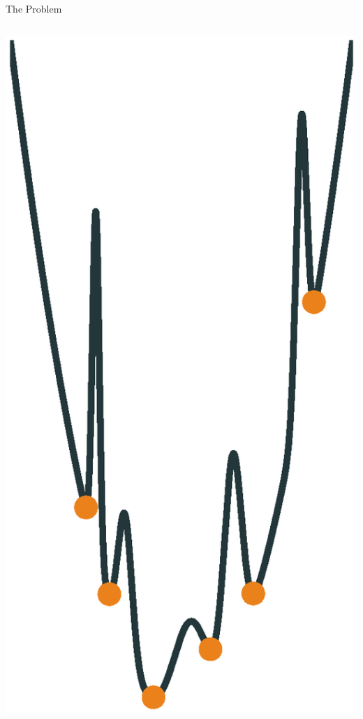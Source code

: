 \documentclass[10pt]{beamer}
\begin{document}
\begin{frame}[fragile]{The Problem}
\begin{columns}{}
\begin{column}{0.45\textwidth}
\begin{overprint}
				\includegraphics[width=0.9\linewidth]{images/manymins.eps}

\end{overprint}
\end{column}
\end{columns}
\end{frame}
\end{document}
